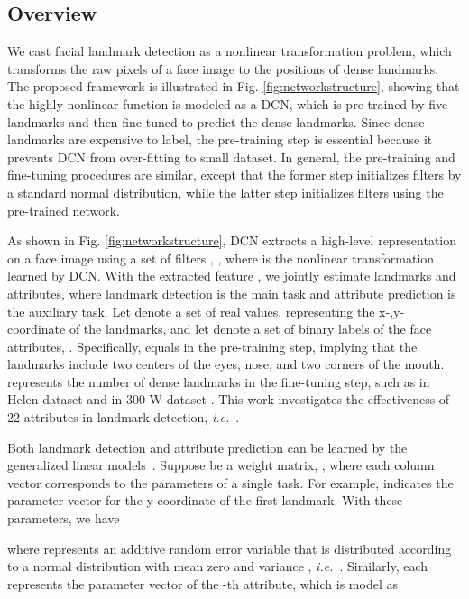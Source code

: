 \documentclass[10pt,journal,compsoc]{IEEEtran}
\newcommand{\ie}{\emph{i.e.}~}
\begin{document}
\subsection{Overview}
\label{sec:overview}

We cast facial landmark detection as a nonlinear transformation problem, which transforms the raw pixels of a face image to the positions of dense landmarks.
The proposed framework is illustrated in Fig. \ref{fig:networkstructure},
showing that the highly nonlinear function is modeled as a DCN, which is pre-trained by five landmarks and then fine-tuned to predict the dense landmarks.
Since dense landmarks are expensive to label, the pre-training step is essential because it prevents DCN from over-fitting to small dataset.
In general, the pre-training and fine-tuning procedures are similar, except that the former step initializes filters by a standard normal distribution, while the latter step initializes filters using the pre-trained network.

As shown in Fig. \ref{fig:networkstructure}, DCN extracts a high-level representation  on a face image  using a set of filters , , where  is the nonlinear transformation learned by DCN.
With the extracted feature , we jointly estimate landmarks and attributes, where landmark detection is the main task and attribute prediction is the auxiliary task.
Let  denote a set of real values, representing the x-,y-coordinate of the landmarks, and let  denote a set of binary labels of the face attributes, .
Specifically,  equals  in the pre-training step, implying that the landmarks include two centers of the eyes, nose, and two corners of the mouth.
 represents the number of dense landmarks in the fine-tuning step, such as  in Helen dataset \cite{Helen} and  in 300-W dataset \cite{300w}.
This work investigates the effectiveness of 22 attributes in landmark detection, \ie.

Both landmark detection and attribute prediction can be learned by the generalized linear models~\cite{mccullagh1989generalized}.
Suppose  be a weight matrix, , where each column vector corresponds to the parameters of a single task.
For example,  indicates the parameter vector for the y-coordinate of the first landmark.
With these parameters, we have

where  represents an additive random error variable that is distributed according to a normal distribution with mean zero and variance , \ie .
Similarly, each  represents the parameter vector of the -th attribute, which is model as
\end{document}
